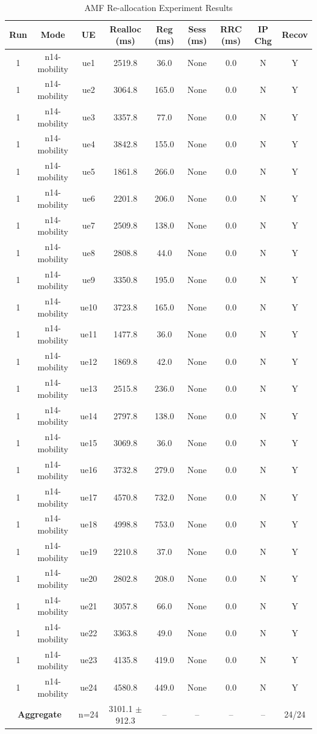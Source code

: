 \begin{table}[ht]
\centering
\begin{tabular}{|c|c|c|c|c|c|c|c|c|}
\hline
Run & Mode & UE & Realloc (ms) & Reg (ms) & Sess (ms) & RRC (ms) & IP Chg & Recov \\
\hline
1 & n14-mobility & ue1 & 2519.8 & 36.0 & None & 0.0 & N & Y \\
1 & n14-mobility & ue2 & 3064.8 & 165.0 & None & 0.0 & N & Y \\
1 & n14-mobility & ue3 & 3357.8 & 77.0 & None & 0.0 & N & Y \\
1 & n14-mobility & ue4 & 3842.8 & 155.0 & None & 0.0 & N & Y \\
1 & n14-mobility & ue5 & 1861.8 & 266.0 & None & 0.0 & N & Y \\
1 & n14-mobility & ue6 & 2201.8 & 206.0 & None & 0.0 & N & Y \\
1 & n14-mobility & ue7 & 2509.8 & 138.0 & None & 0.0 & N & Y \\
1 & n14-mobility & ue8 & 2808.8 & 44.0 & None & 0.0 & N & Y \\
1 & n14-mobility & ue9 & 3350.8 & 195.0 & None & 0.0 & N & Y \\
1 & n14-mobility & ue10 & 3723.8 & 165.0 & None & 0.0 & N & Y \\
1 & n14-mobility & ue11 & 1477.8 & 36.0 & None & 0.0 & N & Y \\
1 & n14-mobility & ue12 & 1869.8 & 42.0 & None & 0.0 & N & Y \\
1 & n14-mobility & ue13 & 2515.8 & 236.0 & None & 0.0 & N & Y \\
1 & n14-mobility & ue14 & 2797.8 & 138.0 & None & 0.0 & N & Y \\
1 & n14-mobility & ue15 & 3069.8 & 36.0 & None & 0.0 & N & Y \\
1 & n14-mobility & ue16 & 3732.8 & 279.0 & None & 0.0 & N & Y \\
1 & n14-mobility & ue17 & 4570.8 & 732.0 & None & 0.0 & N & Y \\
1 & n14-mobility & ue18 & 4998.8 & 753.0 & None & 0.0 & N & Y \\
1 & n14-mobility & ue19 & 2210.8 & 37.0 & None & 0.0 & N & Y \\
1 & n14-mobility & ue20 & 2802.8 & 208.0 & None & 0.0 & N & Y \\
1 & n14-mobility & ue21 & 3057.8 & 66.0 & None & 0.0 & N & Y \\
1 & n14-mobility & ue22 & 3363.8 & 49.0 & None & 0.0 & N & Y \\
1 & n14-mobility & ue23 & 4135.8 & 419.0 & None & 0.0 & N & Y \\
1 & n14-mobility & ue24 & 4580.8 & 449.0 & None & 0.0 & N & Y \\
\multicolumn{2}{|c|}{\textbf{Aggregate}} & n=24 & 3101.1 $\pm$ 912.3 & -- & -- & -- & -- & 24/24 \\
\hline
\end{tabular}
\caption{AMF Re-allocation Experiment Results}
\label{tab:amf_realloc}
\end{table}
